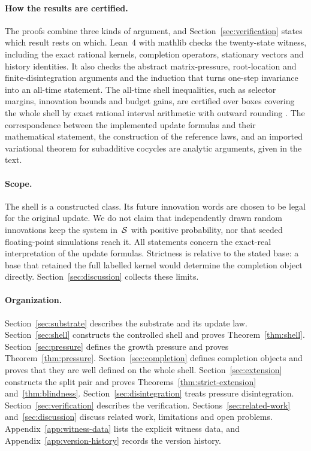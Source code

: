 \paragraph{How the results are certified.}
The proofs combine three kinds of argument, and Section~\ref{sec:verification} states which result rests on which. Lean~4 with mathlib \cite{deMouraUllrich2021Lean4,mathlib2020} checks the twenty-state witness, including the exact rational kernels, completion operators, stationary vectors and history identities. It also checks the abstract matrix-pressure, root-location and finite-disintegration arguments and the induction that turns one-step invariance into an all-time statement. The all-time shell inequalities, such as selector margins, innovation bounds and budget gains, are certified over boxes covering the whole shell by exact rational interval arithmetic with outward rounding \cite{MooreKearfottCloud2009Interval}. The correspondence between the implemented update formulas and their mathematical statement, the construction of the reference laws, and an imported variational theorem for subadditive cocycles \cite{Schreiber1998Subadditive} are analytic arguments, given in the text.

\paragraph{Scope.}
The shell is a constructed class. Its future innovation words are chosen to be legal for the original update. We do not claim that independently drawn random innovations keep the system in~$\mathcal{S}$ with positive probability, nor that seeded floating-point simulations reach it. All statements concern the exact-real interpretation of the update formulas. Strictness is relative to the stated base: a base that retained the full labelled kernel would determine the completion object directly. Section~\ref{sec:discussion} collects these limits.

\paragraph{Organization.}
Section~\ref{sec:substrate} describes the substrate and its update law. Section~\ref{sec:shell} constructs the controlled shell and proves Theorem~\ref{thm:shell}. Section~\ref{sec:pressure} defines the growth pressure and proves Theorem~\ref{thm:pressure}. Section~\ref{sec:completion} defines completion objects and proves that they are well defined on the whole shell. Section~\ref{sec:extension} constructs the split pair and proves Theorems~\ref{thm:strict-extension} and~\ref{thm:blindness}. Section~\ref{sec:disintegration} treats pressure disintegration. Section~\ref{sec:verification} describes the verification. Sections~\ref{sec:related-work} and~\ref{sec:discussion} discuss related work, limitations and open problems. Appendix~\ref{app:witness-data} lists the explicit witness data, and Appendix~\ref{app:version-history} records the version history.
